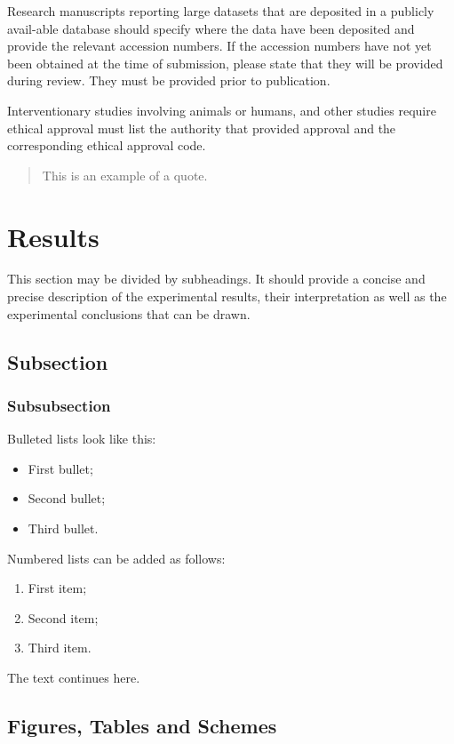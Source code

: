 \documentclass[entropy,article,submit,moreauthors,pdftex]{Definitions/mdpi}
\begin{document}
Research manuscripts reporting large datasets that are deposited in a publicly avail-able database should specify where the data have been deposited and provide the relevant accession numbers. If the accession numbers have not yet been obtained at the time of submission, please state that they will be provided during review. They must be provided prior to publication.

Interventionary studies involving animals or humans, and other studies require ethical approval must list the authority that provided approval and the corresponding ethical approval code.
\begin{quote}
This is an example of a quote.
\end{quote}

\section{Results}

This section may be divided by subheadings. It should provide a concise and precise description of the experimental results, their interpretation as well as the experimental conclusions that can be drawn.
\subsection{Subsection}
\subsubsection{Subsubsection}

Bulleted lists look like this:
\begin{itemize}
\item	First bullet;
\item	Second bullet;
\item	Third bullet.
\end{itemize}

Numbered lists can be added as follows:
\begin{enumerate}
\item	First item; 
\item	Second item;
\item	Third item.
\end{enumerate}

The text continues here. 

\subsection{Figures, Tables and Schemes}
\end{document}
